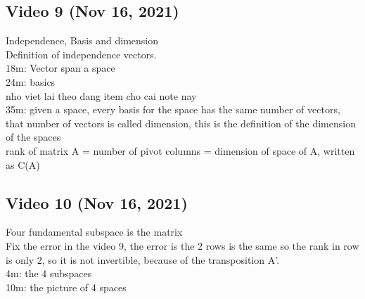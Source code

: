 \subsection{Video 9 (Nov 16, 2021)}
Independence, Basis and dimension
\\Definition of independence vectors.
\\18m: Vector span a space
\\24m: basics
\\nho viet lai theo dang item cho cai note nay
\\35m: given a space, every basis for the space has the same number of vectors, that number of vectors is called dimension, this is the definition of the dimension of the spaces
\\rank of matrix A = number of pivot columns = dimension of space of A, written as C(A)

\subsection{Video 10 (Nov 16, 2021)}
Four fundamental subspace is the matrix
\\Fix the error in the video 9, the error is the 2 rows is the same so the rank in row is only 2, so it is not invertible, because of the transposition A'.
\\4m: the 4 subspaces
\\10m: the picture of 4 spaces

